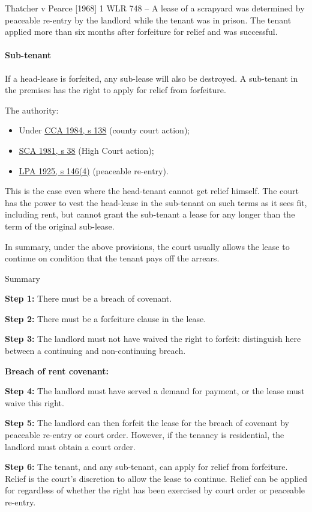 \documentclass[
]{article}
\providecommand{\tightlist}{%
  \setlength{\itemsep}{0pt}\setlength{\parskip}{0pt}}
\newenvironment{env-fdd3b853-72b2-4779-a214-b5da0ccdb5e7}
{
    \savenotes\tcolorbox[blanker,breakable,left=5pt,borderline west={2pt}{-4pt}{gray}]
}
{
    \endtcolorbox\spewnotes
}
\begin{document}
Thatcher v Pearce {[}1968{]} 1 WLR 748 -- A lease of a scrapyard was
determined by peaceable re-entry by the landlord while the tenant was in
prison. The tenant applied more than six months after forfeiture for
relief and was successful.

\hypertarget{sub-tenant}{%
\paragraph{Sub-tenant}\label{sub-tenant}}

If a head-lease is forfeited, any sub-lease will also be destroyed. A
sub-tenant in the premises has the right to apply for relief from
forfeiture.

The authority:

\begin{itemize}
\tightlist
\item
  Under
  \href{https://www.legislation.gov.uk/ukpga/1984/28/section/138}{CCA
  1984, s 138} (county court action);
\item
  \href{https://www.legislation.gov.uk/ukpga/1981/54/section/38}{SCA
  1981, s 38} (High Court action);
\item
  \href{https://www.legislation.gov.uk/ukpga/Geo5/15-16/20/section/146}{LPA
  1925, s 146(4)} (peaceable re-entry).
\end{itemize}

This is the case even where the head-tenant cannot get relief himself.
The court has the power to vest the head-lease in the sub-tenant on such
terms as it sees fit, including rent, but cannot grant the sub-tenant a
lease for any longer than the term of the original sub-lease.

In summary, under the above provisions, the court usually allows the
lease to continue on condition that the tenant pays off the arrears.

\begin{env-fdd3b853-72b2-4779-a214-b5da0ccdb5e7}

Summary

\textbf{Step 1:} There must be a breach of covenant.

\textbf{Step 2:} There must be a forfeiture clause in the lease.

\textbf{Step 3:} The landlord must not have waived the right to forfeit:
distinguish here between a continuing and non-continuing breach.

\textbf{Breach of rent covenant:}

\textbf{Step 4:} The landlord must have served a demand for payment, or
the lease must waive this right.

\textbf{Step 5:} The landlord can then forfeit the lease for the breach
of covenant by peaceable re-entry or court order. However, if the
tenancy is residential, the landlord must obtain a court order.

\textbf{Step 6:} The tenant, and any sub-tenant, can apply for relief
from forfeiture. Relief is the court's discretion to allow the lease to
continue. Relief can be applied for regardless of whether the right has
been exercised by court order or peaceable re-entry.

\end{env-fdd3b853-72b2-4779-a214-b5da0ccdb5e7}
\end{document}
